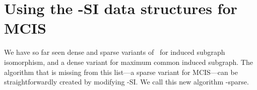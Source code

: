 
\section{Using the \McSplit-SI data structures for MCIS}

We have so far seen dense and sparse variants of \McSplit\ for induced subgraph isomorphism, and
a dense variant for maximum common induced subgraph.  The algorithm that is missing from this
list---a sparse variant for MCIS---can be straightforwardly created by modifying \McSplit-SI. 
We call this new algorithm \McSplit-sparse.

